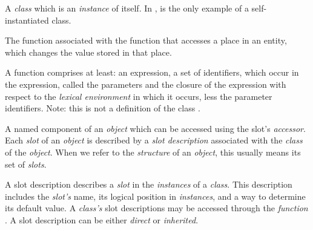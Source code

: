 \begin{optDefinition}
\begin{definitions}

       A {\em class} which is
    an {\em instance} of itself.  In \eulisp,  is the only
    example of a self-instantiated class.

     The function
    associated with the function that accesses a place in an entity, which
    changes the value stored in that place.


     A function
    comprises at least: an expression, a set of identifiers, which occur in the
    expression, called the parameters and the closure of the expression with
    respect to the {\em lexical environment} in which it occurs, less the
    parameter identifiers.  Note: this is not a definition of the class
    .

      A named component of an {\em object}
    which can be accessed using the slot's {\em accessor}.  Each {\em slot} of
    an {\em object} is described by a {\em slot description} associated with the
    {\em class} of the {\em object}.  When we refer to the {\em structure} of an
    {\em object}, this usually means its set of {\em slots}.

      A slot
    description describes a {\em slot} in the {\em instances} of a {\em class}.
    This description includes the {\em slot's} name, its logical position in
    {\em instances}, and a way to determine its default value.  A {\em class's}
    slot descriptions may be accessed through the {\em function}
    .  A slot description can be either
    {\em direct} or {\em inherited}.


\end{definitions}
\end{optDefinition}
